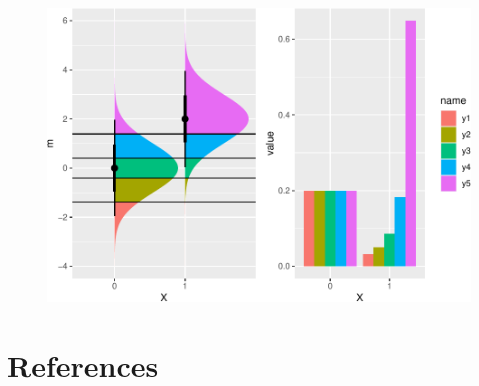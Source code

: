 \documentclass[
  man,floatsintext]{apa6}
\begin{document}
\begin{figure}

{\centering \includegraphics{paper-new_files/figure-latex/unnamed-chunk-3-1} 

}

\caption{ }\label{fig:unnamed-chunk-3}
\end{figure}

\newpage

\section{References}\label{references}
\end{document}
